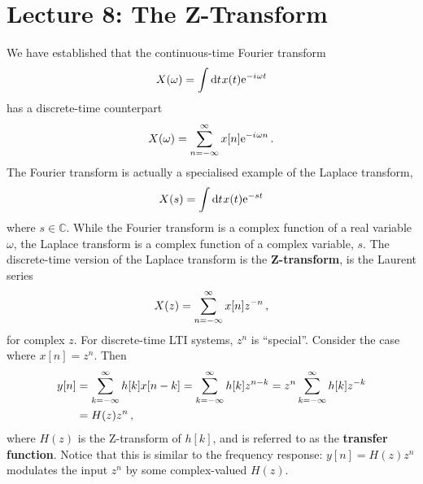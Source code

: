 \section{Lecture 8: The Z-Transform}

We have established that the continuous-time Fourier transform
%
\begin{displaymath}
  X(\omega) = \int\mathrm{d}t\mkern1mux(t)\mathrm{e}^{-{i\mkern1mu}\omega t}
\end{displaymath}
%
has a discrete-time counterpart
%
\begin{displaymath}
  X(\omega) = \sum_{n=-\infty}^\infty x[n]\mathrm{e}^{-{i\mkern1mu}\omega n} \,.
\end{displaymath}
%
The Fourier transform is actually a specialised example of
the Laplace transform,
%
\begin{equation}
  X(s) = \int\mathrm{d}t\mkern1mux(t)\mathrm{e}^{-st}
\end{equation}
%
where $s\in\mathbb{C}$. While the Fourier transform is a complex
function of a real variable $\omega$, the Laplace transform is a
complex function of a complex variable, $s$. The discrete-time
version of the Laplace transform is the \textbf{Z-transform}, is
the Laurent series
%
\begin{equation}
  X(z) = \sum_{n=-\infty}^\infty x[n]z^{-n} \,,
\end{equation}
%
for complex $z$. For discrete-time LTI systems, $z^n$ is ``special''.
Consider the case where $x[n] = z^n$. Then
%
\begin{align*}
  y[n] &= \sum_{k=-\infty}^\infty h[k]x[n-k] = \sum_{k=-\infty}^\infty h[k]z^{n-k} = z^n\sum_{k=-\infty}^\infty h[k]z^{-k} \\
  &= H(z)z^n \,,
\end{align*}
%
where $H(z)$ is the Z-transform of $h[k]$, and is referred to as the
\textbf{transfer function}. Notice that this is similar to the
frequency response: $y[n] = H(z)z^n$ modulates the input $z^n$ by some
complex-valued $H(z)$.

